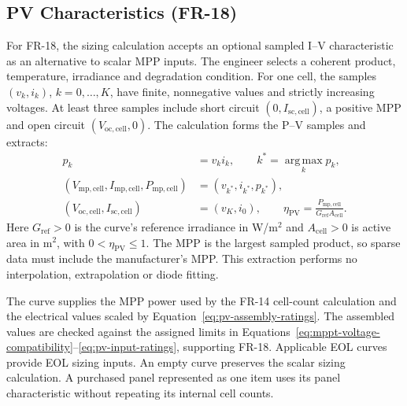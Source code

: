 \subsection{PV Characteristics (FR-18)}
For FR-18, the sizing calculation accepts an optional sampled I--V characteristic as an alternative to scalar MPP inputs. The engineer selects a coherent product, temperature, irradiance and degradation condition. For one cell, the samples $(v_k,i_k)$, $k=0,\ldots,K$, have finite, nonnegative values and strictly increasing voltages. At least three samples include short circuit $(0,I_{\mathrm{sc,cell}})$, a positive MPP and open circuit $(V_{\mathrm{oc,cell}},0)$. The calculation forms the P--V samples and extracts:
\begin{align}
    p_k&=v_k i_k,\qquad k^*=\operatorname*{arg\,max}_k p_k,
    \label{eq:pv-sampled-power}\\
    (V_{\mathrm{mp,cell}},I_{\mathrm{mp,cell}},P_{\mathrm{mp,cell}})
    &=(v_{k^*},i_{k^*},p_{k^*}),
    \label{eq:pv-sampled-mpp}\\
    (V_{\mathrm{oc,cell}},I_{\mathrm{sc,cell}})&=(v_K,i_0),
    \qquad \eta_{\mathrm{PV}}=\frac{P_{\mathrm{mp,cell}}}{G_{\mathrm{ref}}A_{\mathrm{cell}}}.
    \label{eq:pv-curve-efficiency}
\end{align}
Here $G_{\mathrm{ref}}>0$ is the curve's reference irradiance in W/m$^2$ and $A_{\mathrm{cell}}>0$ is active area in m$^2$, with $0<\eta_{\mathrm{PV}}\leq1$. The MPP is the largest sampled product, so sparse data must include the manufacturer's MPP. This extraction performs no interpolation, extrapolation or diode fitting.

The curve supplies the MPP power used by the FR-14 cell-count calculation and the electrical values scaled by Equation~\eqref{eq:pv-assembly-ratings}. The assembled values are checked against the assigned limits in Equations~\eqref{eq:mppt-voltage-compatibility}--\eqref{eq:pv-input-ratings}, supporting FR-18. Applicable EOL curves provide EOL sizing inputs. An empty curve preserves the scalar sizing calculation. A purchased panel represented as one item uses its panel characteristic without repeating its internal cell counts.

